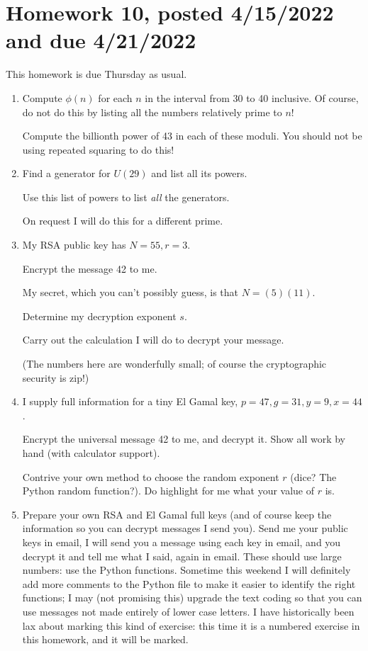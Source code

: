 \documentclass[12pt]{article}
\begin{document}
\section{Homework 10, posted 4/15/2022 and due 4/21/2022}

This homework is due Thursday as usual.

\begin{enumerate}

\item  Compute $\phi(n)$ for each $n$ in the interval from 30 to 40 inclusive.  Of course, do not do this by listing all the numbers relatively prime to $n$!

Compute the billionth power of 43 in each of these moduli.  You should not be using repeated squaring to do this!

\item  Find a generator for $U(29)$ and list all its powers.

Use this list of powers to list {\em all\/} the generators.

On request I will do this for a different prime.

\item My RSA public key has $N=55, r=3$.

Encrypt the message 42 to me.

My secret, which you can't possibly guess, is that $N=(5)(11)$.

Determine my decryption exponent $s$.

Carry out the calculation I will do to decrypt your message.

(The numbers here are wonderfully small;  of course the cryptographic security is zip!)

\item  I supply full information for a tiny El Gamal key, $p=47, g=31, y = 9, x=44$.

Encrypt the universal message 42 to me, and decrypt it.  Show all work by hand (with calculator support).

Contrive your own method to choose the random exponent $r$ (dice?  The Python random function?).  Do highlight for me what your value of $r$ is.

\item Prepare your own RSA and El Gamal full keys (and of course keep the information so you can decrypt messages I send you).
Send me your public keys in email, I will send you a message using each key in email, and you decrypt it and tell me what I said, again in email.  These should use large numbers:  use the Python functions.  Sometime this weekend I will definitely add more comments to the Python file to make it easier to identify the right functions;  I may (not promising this) upgrade the text coding so that you can use messages not made entirely of lower case letters.  I have historically been lax about marking this kind of exercise:  this time it is a numbered exercise in this homework, and it will be marked.


\end{enumerate}
\end{document}
